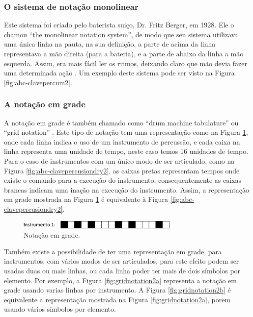 \subsubsection{O sistema de notação monolinear}
Este sistema foi criado pelo baterista suiço, Dr. Fritz Berger, em 1928. 
Ele o chamou ``the monolinear notation system'', 
de modo que seu sistema utilizava uma única linha na pauta, na sua definição,
a parte de acima da linha representava a mão direita (para a bateria), e
a parte de abaixo da linha a mão esquerda.
Assim, era mais fácil ler os ritmos, deixando claro que mão devia fazer uma determinada ação
\cite[pp. 148]{beck1995encyclopedia} \cite[pp. 332]{dean2012drum}.
Um exemplo deste sistema pode ser visto na Figura \ref{fig:abc-clavepercum2}.

\subsubsection{A notação em grade}
A notação em grade é também chamado como ``drum machine tabulature'' \cite{badness1991drum} ou
``grid notation'' \cite{bardet1985200}. Este tipo de notação tem uma representação como na Figura \ref{fig:gridnotation1},
onde cada linha indica o uso de um instrumento de percussão, 
e cada caixa na linha representa uma unidade de tempo, neste caso temos 16 unidades de tempo.
Para o caso de instrumentos com um único modo de ser articulado, como na Figura \ref{fig:abc-clavepercusiondry2},
as caixas pretas representam tempos onde existe o comando para a execução do instrumento,
consequentemente as caixas brancas indicam uma inação na execução do instrumento.
Assim, a representação em grade mostrada na Figura \ref{fig:gridnotation1} 
é equivalente à Figura \ref{fig:abc-clavepercusiondry2}.
\begin{figure}[h]
    \centering 
\includegraphics[width=0.7\textwidth]{chapters/cap-musica-basica/gridnotation.eps}
    \caption{Notação em grade.}\label{fig:gridnotation1}
\end{figure}

Também existe a possibilidade de ter uma representação em grade, para instrumentos, 
com vários modos de ser articulados, para este efeito podem ser usadas duas ou mais linhas,
ou cada linha poder ter mais de dois símbolos por elemento.
Por exemplo, a Figura \ref{fig:gridnotation2a} representa a notação em grade usando
varias linhas por instrumento. A Figura \ref{fig:gridnotation2b} é equivalente 
a representação mostrada na Figura \ref{fig:gridnotation2a}, porem usando vários símbolos por elemento.

